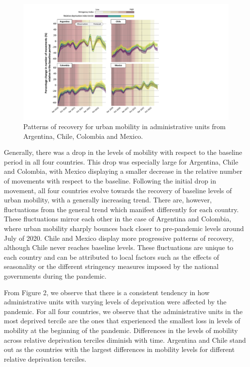 \documentclass[
  11pt,
]{article}
\begin{document}
\begin{figure}

{\centering \includegraphics{figures/prediction-rdi-band.pdf}

}

\caption{Patterns of recovery for urban mobility in administrative units
from Argentina, Chile, Colombia and Mexico.}

\end{figure}

Generally, there was a drop in the levels of mobility with respect to
the baseline period in all four countries. This drop was especially
large for Argentina, Chile and Colombia, with Mexico displaying a
smaller decrease in the relative number of movements with respect to the
baseline. Following the initial drop in movement, all four countries
evolve towards the recovery of baseline levels of urban mobility, with a
generally increasing trend. There are, however, fluctuations from the
general trend which manifest differently for each country. These
fluctuations mirror each other in the case of Argentina and Colombia,
where urban mobility sharply bounces back closer to pre-pandemic levels
around July of 2020. Chile and Mexico display more progressive patterns
of recovery, although Chile never reaches baseline levels. These
fluctuations are unique to each country and can be attributed to local
factors such as the effects of seasonality or the different stringency
measures imposed by the national governments during the pandemic.

From Figure 2, we observe that there is a consistent tendency in how
administrative units with varying levels of deprivation were affected by
the pandemic. For all four countries, we observe that the administrative
units in the most deprived tercile are the ones that experienced the
smallest loss in levels of mobility at the beginning of the pandemic.
Differences in the levels of mobility across relative deprivation
terciles diminish with time. Argentina and Chile stand out as the
countries with the largest differences in mobility levels for different
relative deprivation terciles.
\end{document}
